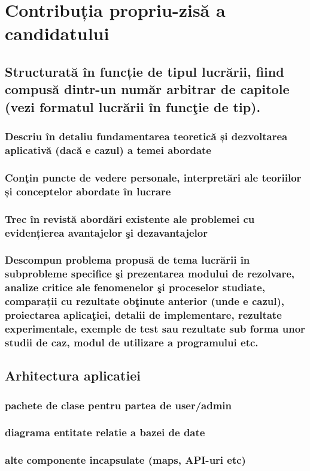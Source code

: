 \chapter{Contribuția propriu-zisă a candidatului}

\section{Structurată în funcție de tipul lucrării, fiind compusă dintr-un număr arbitrar de capitole (vezi formatul lucrării în funcţie de tip).}
    \subsection{Descriu în detaliu fundamentarea teoretică și dezvoltarea aplicativă (dacă e cazul) a temei abordate}
    \subsection{Conţin puncte de vedere personale, interpretări ale teoriilor și conceptelor abordate în lucrare}
    \subsection{Trec în revistă abordări existente ale problemei cu evidențierea avantajelor şi dezavantajelor}
    \subsection{Descompun problema propusă de tema lucrării în subprobleme specifice şi prezentarea modului de rezolvare, analize critice ale fenomenelor şi proceselor studiate, comparații cu rezultate obţinute anterior (unde e cazul), proiectarea aplicaţiei, detalii de implementare, rezultate experimentale, exemple de test sau rezultate sub forma unor studii de caz, modul de utilizare a programului etc.}
\section{Arhitectura aplicatiei}
    \subsection{pachete de clase pentru partea de user/admin}
    \subsection{diagrama entitate relatie a bazei de date}
    \subsection{alte componente incapsulate (maps, API-uri etc)}
